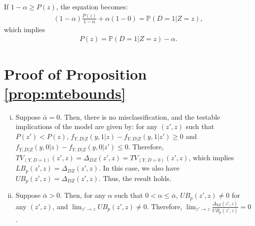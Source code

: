 \documentclass[11pt,reqno]{amsart}
\theoremstyle{plain}
\numberwithin{equation}{section}
\begin{document}
If $1-\alpha \geq P(z)$, the equation becomes:
\begin{eqnarray*}
(1-\alpha)\frac{P(z)}{1-\alpha}+\alpha (1-0)=\mathbb P(D=1\vert Z=z),
\end{eqnarray*}
which implies 
\begin{eqnarray}
P(z)=\mathbb P(D=1\vert Z=z)-\alpha.
\end{eqnarray}



\section{Proof of Proposition \ref{prop:mtebounds}}\label{proof:mtebounds}
\begin{enumerate}[(i)]
\item Suppose $\bar{\alpha}=0$. Then, there is no misclassification, and the testable implications of the model are given by: for any $(z',z)$ such that $P(z') < P(z)$,
$f_{Y,D\vert Z}(y,1\vert z)-f_{Y,D\vert Z}(y,1\vert z')\geq 0$ and $f_{Y,D\vert Z}(y,0\vert z)-f_{Y,D\vert Z}(y,0\vert z')\leq 0$. Therefore, $TV_{(Y,D=1)}(z',z)=\Delta_{DZ}(z',z)=TV_{(Y,D=0)}(z',z)$, which implies $LB_p(z',z)=\Delta_{DZ}(z',z)$. In this case, we also have $UB_p(z',z)=\Delta_{DZ}(z',z)$. Thus, the result holds. 
\item Suppose $\bar{\alpha} > 0$. Then, for any $\alpha$ such that $0 <\alpha \leq \bar{\alpha}$, $UB_p(z',z)\neq 0$ for any $(z',z)$, and $\lim_{z' \rightarrow z} UB_p(z',z)\neq 0$. Therefore, $\lim_{z' \rightarrow z} \frac{\Delta_{YZ}(z',z)}{UB_p(z',z)}=0$.
\end{enumerate}
\end{document}
